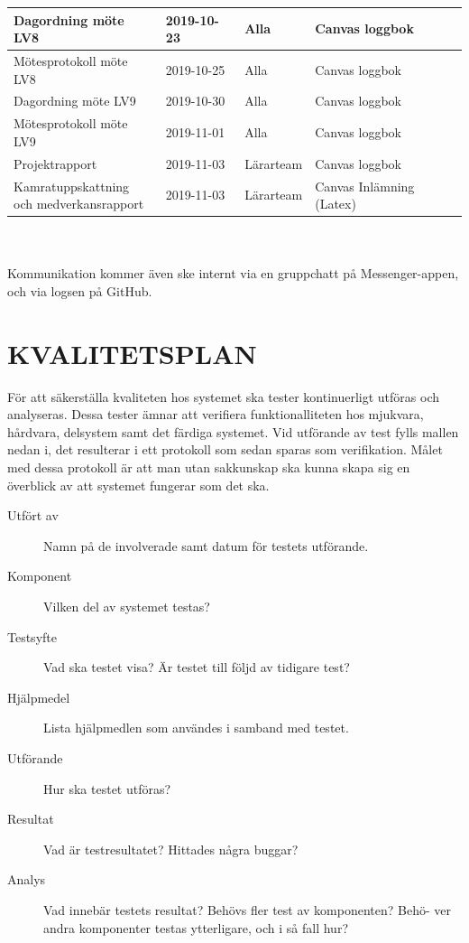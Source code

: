 \documentclass[a4paper]{article}
\begin{document}
\begin{tabular}{|l|l|l|l|}
Dagordning möte LV8 & 2019-10-23 & Alla & Canvas loggbok \\ \hline
Mötesprotokoll möte LV8 & 2019-10-25 & Alla & Canvas loggbok \\ \hline

Dagordning möte LV9 & 2019-10-30 & Alla & Canvas loggbok \\ \hline
Mötesprotokoll möte LV9 & 2019-11-01 & Alla & Canvas loggbok \\ \hline
Projektrapport & 2019-11-03 & Lärarteam & Canvas loggbok \\ \hline
\pbox{20cm}{Kamratuppskattning \\ och medverkansrapport} & 2019-11-03 & Lärarteam & Canvas Inlämning (Latex) \\ \hline



\end{tabular}
\\ \\
Kommunikation kommer även ske internt via en gruppchatt på Messenger-appen, och via logsen på GitHub.
\\

\section{KVALITETSPLAN}
\label{sec:kval}

För att säkerställa kvaliteten hos systemet ska tester kontinuerligt utföras och analyseras. Dessa tester ämnar att verifiera funktionalliteten hos mjukvara, hårdvara, delsystem samt det färdiga systemet. Vid utförande av test fylls mallen nedan i, det resulterar i ett protokoll som sedan sparas som verifikation. Målet med dessa protokoll är att man utan sakkunskap ska kunna skapa sig en överblick av att systemet fungerar som det ska.

\begin{description}
	\item[Utfört av] Namn på de involverade samt datum för testets utförande.

	\item[Komponent] Vilken del av systemet testas?

	\item[Testsyfte] Vad ska testet visa? Är testet till följd av tidigare test?

	\item[Hjälpmedel] Lista hjälpmedlen som användes i samband med testet.

	\item[Utförande] Hur ska testet utföras?

	\item[Resultat] Vad är testresultatet? Hittades några buggar?

	\item[Analys] Vad innebär testets resultat? Behövs fler test av komponenten? Behö-
	ver andra komponenter testas ytterligare, och i så fall hur?
\end{description}
\end{document}
